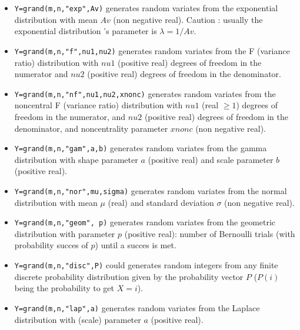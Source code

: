 \begin{description}
\begin{itemize}
\item {} \verb!Y=grand(m,n,"exp",Av)! generates random variates from the exponential
  distribution with mean $Av$ (non negative real). Caution : usually
  the exponential distribution 's parameter is $\lambda= 1/Av$.  
  
\item {} 
  \verb!Y=grand(m,n,"f",nu1,nu2)! generates random variates from the F 
  (variance ratio) distribution with $nu1$ (positive real)
  degrees of freedom in the numerator and $nu2$ (positive real) 
  degrees of freedom in the denominator. 
  
\item {} 
  \verb!Y=grand(m,n,"nf",nu1,nu2,xnonc)! generates random variates from the noncentral 
  F (variance ratio)  distribution with $nu1$ (real $\ge 1$) degrees of freedom 
  in the numerator, and $nu2$ (positive real) degrees of freedom in the denominator, 
  and noncentrality parameter $xnonc$ (non negative real). 
  
\item {} \verb!Y=grand(m,n,"gam",a,b)! generates random variates from the gamma 
  distribution with shape parameter $a$ (positive real) and scale
  parameter $b$ (positive real).
  
\item {} 
  \verb!Y=grand(m,n,"nor",mu,sigma)! generates random variates from the normal 
  distribution with mean $\mu$ (real)  and standard deviation $\sigma$
  (non negative real). 
  
\item {} \verb!Y=grand(m,n,"geom", p)! generates random variates from the geometric
  distribution with parameter $p$ (positive real): number of Bernoulli trials (with 
  probability succes of $p$) until a succes is met.

\item {} 
  \verb!Y=grand(m,n,"disc",P)! could generates random integers from any
  finite discrete probability distribution given by the probability
  vector $P$ ($P(i)$ being the probability to get $X=i$).
  
\item {} 
  \verb!Y=grand(m,n,"lap",a)! generates random variates from the Laplace 
  distribution with (scale) parameter $a$ (positive real).
  

\end{itemize}
\end{description}

